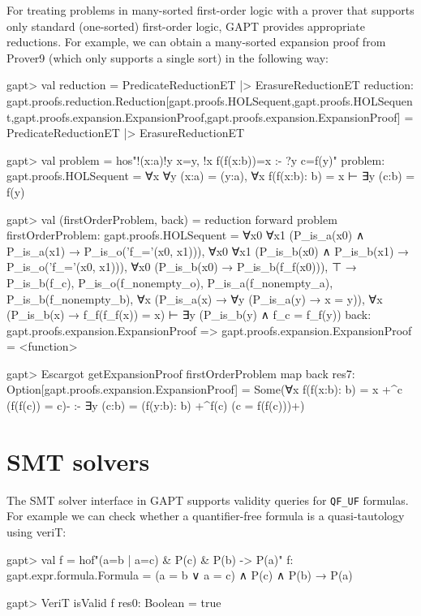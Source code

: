 \documentclass[a4paper,11pt]{book}
\begin{document}
For treating problems in many-sorted first-order logic with a prover that supports only
standard (one-sorted) first-order logic, GAPT provides appropriate reductions.
For example, we can obtain a many-sorted expansion proof from Prover9
(which only supports a single sort) in the following way:
\begin{clilisting}
gapt> val reduction = PredicateReductionET |> ErasureReductionET
reduction: gapt.proofs.reduction.Reduction[gapt.proofs.HOLSequent,gapt.proofs.HOLSequent,gapt.proofs.expansion.ExpansionProof,gapt.proofs.expansion.ExpansionProof] = PredicateReductionET |> ErasureReductionET

gapt> val problem = hos"!(x:a)!y x=y, !x f(f(x:b))=x :- ?y c=f(y)"
problem: gapt.proofs.HOLSequent = ∀x ∀y (x:a) = (y:a), ∀x f(f(x:b): b) = x ⊢ ∃y (c:b) = f(y)

gapt> val (firstOrderProblem, back) = reduction forward problem
firstOrderProblem: gapt.proofs.HOLSequent =
∀x0 ∀x1 (P_is_a(x0) ∧ P_is_a(x1) → P_is_o('f_='(x0, x1))),
∀x0 ∀x1 (P_is_b(x0) ∧ P_is_b(x1) → P_is_o('f_='(x0, x1))),
∀x0 (P_is_b(x0) → P_is_b(f_f(x0))),
⊤ → P_is_b(f_c),
P_is_o(f_nonempty_o),
P_is_a(f_nonempty_a),
P_is_b(f_nonempty_b),
∀x (P_is_a(x) → ∀y (P_is_a(y) → x = y)),
∀x (P_is_b(x) → f_f(f_f(x)) = x)
⊢
∃y (P_is_b(y) ∧ f_c = f_f(y))
back: gapt.proofs.expansion.ExpansionProof => gapt.proofs.expansion.ExpansionProof = <function>

gapt> Escargot getExpansionProof firstOrderProblem map back
res7: Option[gapt.proofs.expansion.ExpansionProof] =
Some(∀x f(f(x:b): b) = x +^{c} (f(f(c)) = c)-
:-
∃y (c:b) = (f(y:b): b) +^{f(c)} (c = f(f(c)))+)

\end{clilisting}

\section{SMT solvers}

The SMT solver interface in GAPT supports validity queries for \verb,QF_UF,
formulas.  For example we can check whether a quantifier-free formula is a
quasi-tautology using veriT:
\begin{clilisting}
gapt> val f = hof"(a=b | a=c) & P(c) & P(b) -> P(a)"
f: gapt.expr.formula.Formula = (a = b ∨ a = c) ∧ P(c) ∧ P(b) → P(a)

\end{clilisting}

\begin{clilisting}
gapt> VeriT isValid f
res0: Boolean = true

\end{clilisting}
\end{document}
